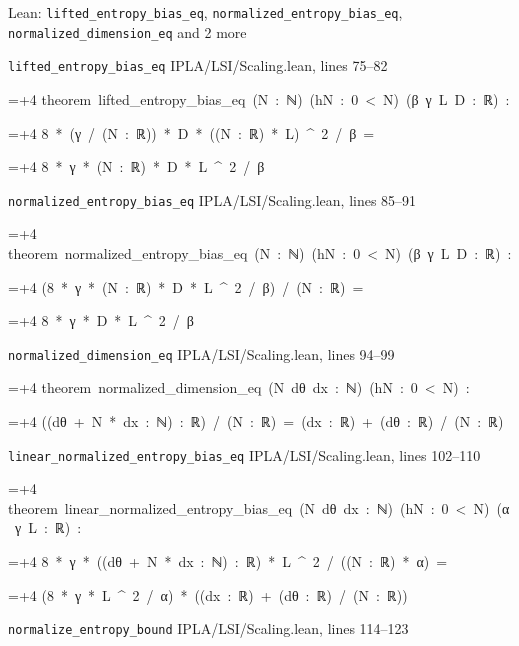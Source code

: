 \documentclass[11pt,a4paper]{report}
\newlength{\leancharwidth}
\newenvironment{leancode}{\par\smallskip\begingroup\ttfamily\footnotesize\raggedright
  \settowidth{\leancharwidth}{M}\setlength{\parskip}{0pt}\setlength{\parindent}{0pt}
  \frenchspacing}{\par\endgroup\smallskip}
\newcommand{\leanline}[2]{\hangindent=\dimexpr#1\leancharwidth+4\leancharwidth\relax
  \hangafter=1\noindent\hspace*{#1\leancharwidth}#2\par}
\newcommand{\leansource}[1]{\par{\footnotesize\color{leanmuted}#1}\par}
\begin{document}
\begin{leanbox}{Lean: \texttt{lifted\_\allowbreak{}entropy\_\allowbreak{}bias\_\allowbreak{}eq}, \texttt{normalized\_\allowbreak{}entropy\_\allowbreak{}bias\_\allowbreak{}eq}, \texttt{normalized\_\allowbreak{}dimension\_\allowbreak{}eq} and 2 more}
\leansource{\texttt{lifted\_\allowbreak{}entropy\_\allowbreak{}bias\_\allowbreak{}eq} \quad IPLA/\allowbreak{}LSI/\allowbreak{}Scaling.lean, lines 75–82}
\begin{leancode}
\leanline{0}{theorem\ lifted\_entropy\_bias\_eq\ (N\ :\ ℕ)\ (hN\ :\ 0\ <\ N)\ (β\ γ\ L\ D\ :\ ℝ)\ :}
\leanline{4}{8\ *\ (γ\ /\ (N\ :\ ℝ))\ *\ D\ *\ ((N\ :\ ℝ)\ *\ L)\ \textasciicircum{}\ 2\ /\ β\ =}
\leanline{6}{8\ *\ γ\ *\ (N\ :\ ℝ)\ *\ D\ *\ L\ \textasciicircum{}\ 2\ /\ β}
\end{leancode}
\leansource{\texttt{normalized\_\allowbreak{}entropy\_\allowbreak{}bias\_\allowbreak{}eq} \quad IPLA/\allowbreak{}LSI/\allowbreak{}Scaling.lean, lines 85–91}
\begin{leancode}
\leanline{0}{theorem\ normalized\_entropy\_bias\_eq\ (N\ :\ ℕ)\ (hN\ :\ 0\ <\ N)\ (β\ γ\ L\ D\ :\ ℝ)\ :}
\leanline{4}{(8\ *\ γ\ *\ (N\ :\ ℝ)\ *\ D\ *\ L\ \textasciicircum{}\ 2\ /\ β)\ /\ (N\ :\ ℝ)\ =}
\leanline{6}{8\ *\ γ\ *\ D\ *\ L\ \textasciicircum{}\ 2\ /\ β}
\end{leancode}
\leansource{\texttt{normalized\_\allowbreak{}dimension\_\allowbreak{}eq} \quad IPLA/\allowbreak{}LSI/\allowbreak{}Scaling.lean, lines 94–99}
\begin{leancode}
\leanline{0}{theorem\ normalized\_dimension\_eq\ (N\ dθ\ dx\ :\ ℕ)\ (hN\ :\ 0\ <\ N)\ :}
\leanline{4}{((dθ\ +\ N\ *\ dx\ :\ ℕ)\ :\ ℝ)\ /\ (N\ :\ ℝ)\ =\ (dx\ :\ ℝ)\ +\ (dθ\ :\ ℝ)\ /\ (N\ :\ ℝ)}
\end{leancode}
\leansource{\texttt{linear\_\allowbreak{}normalized\_\allowbreak{}entropy\_\allowbreak{}bias\_\allowbreak{}eq} \quad IPLA/\allowbreak{}LSI/\allowbreak{}Scaling.lean, lines 102–110}
\begin{leancode}
\leanline{0}{theorem\ linear\_normalized\_entropy\_bias\_eq\ (N\ dθ\ dx\ :\ ℕ)\ (hN\ :\ 0\ <\ N)\ (α\ γ\ L\ :\ ℝ)\ :}
\leanline{4}{8\ *\ γ\ *\ ((dθ\ +\ N\ *\ dx\ :\ ℕ)\ :\ ℝ)\ *\ L\ \textasciicircum{}\ 2\ /\ ((N\ :\ ℝ)\ *\ α)\ =}
\leanline{6}{(8\ *\ γ\ *\ L\ \textasciicircum{}\ 2\ /\ α)\ *\ ((dx\ :\ ℝ)\ +\ (dθ\ :\ ℝ)\ /\ (N\ :\ ℝ))}
\end{leancode}
\leansource{\texttt{normalize\_\allowbreak{}entropy\_\allowbreak{}bound} \quad IPLA/\allowbreak{}LSI/\allowbreak{}Scaling.lean, lines 114–123}
\begin{leancode}

\end{leancode}
\end{leanbox}
\end{document}
